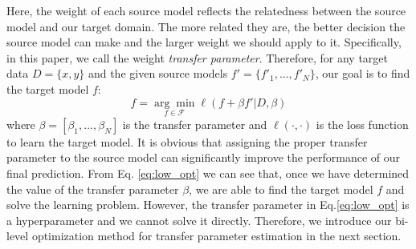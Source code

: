 Here, the weight of each source model reflects the relatedness between the source model and our target domain. The more related they are, the better decision the source model can make and the larger weight we should apply to it. Specifically, in this paper, we call the weight \textit{transfer parameter}. Therefore, for any target data $D=\{x,y\}$ and the given source models $f'=\{f'_1,...,f'_N\}$, our goal is to find the target model $f$:
\begin{equation}\label{eq:low_opt}
f=\underset{f \in \mathcal{F}}{\arg \min}\ell\left(f+\beta f'|D,\beta\right)
\end{equation} 
where $\beta=[\beta_1,...,\beta_N]$ is the transfer parameter and $\ell(\cdot,\cdot)$ is the loss function to learn the target model.
It is obvious that assigning the proper transfer parameter to the source model can significantly improve the performance of our final prediction.
From Eq. \eqref{eq:low_opt} we can see that, once we have determined the value of the transfer parameter $\beta$, we are able to find the target model $f$ and solve the learning problem.
However, the transfer parameter in Eq.\eqref{eq:low_opt} is a hyperparameter and we cannot solve it directly. Therefore, we introduce our bi-level optimization method for transfer parameter estimation in the next section.







